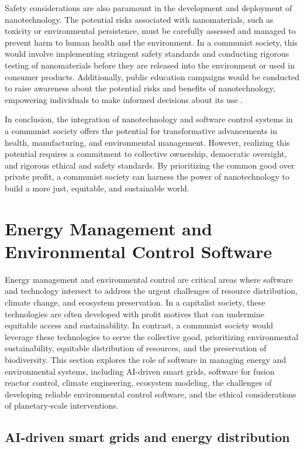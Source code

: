 Safety considerations are also paramount in the development and deployment of nanotechnology. The potential risks associated with nanomaterials, such as toxicity or environmental persistence, must be carefully assessed and managed to prevent harm to human health and the environment. In a communist society, this would involve implementing stringent safety standards and conducting rigorous testing of nanomaterials before they are released into the environment or used in consumer products. Additionally, public education campaigns would be conducted to raise awareness about the potential risks and benefits of nanotechnology, empowering individuals to make informed decisions about its use \cite[pp.~410-417]{meyer2004nanotechnology}.

In conclusion, the integration of nanotechnology and software control systems in a communist society offers the potential for transformative advancements in health, manufacturing, and environmental management. However, realizing this potential requires a commitment to collective ownership, democratic oversight, and rigorous ethical and safety standards. By prioritizing the common good over private profit, a communist society can harness the power of nanotechnology to build a more just, equitable, and sustainable world.\section{Energy Management and Environmental Control Software}

Energy management and environmental control are critical areas where software and technology intersect to address the urgent challenges of resource distribution, climate change, and ecosystem preservation. In a capitalist society, these technologies are often developed with profit motives that can undermine equitable access and sustainability. In contrast, a communist society would leverage these technologies to serve the collective good, prioritizing environmental sustainability, equitable distribution of resources, and the preservation of biodiversity. This section explores the role of software in managing energy and environmental systems, including AI-driven smart grids, software for fusion reactor control, climate engineering, ecosystem modeling, the challenges of developing reliable environmental control software, and the ethical considerations of planetary-scale interventions.

\subsection{AI-driven smart grids and energy distribution}

